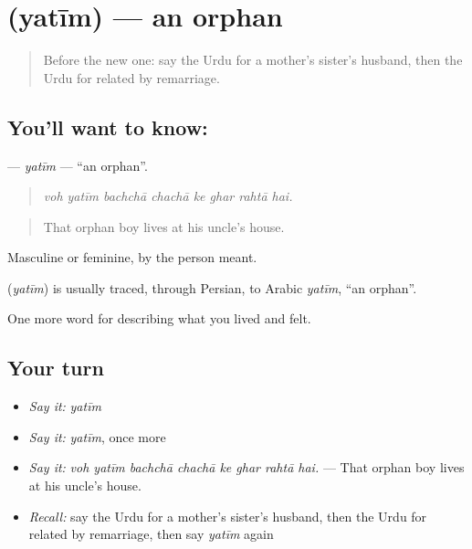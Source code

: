 \section[\texorpdfstring{\ur{یتیم} (yatīm)}{یتیم (yatīm)}]{ (yatīm) — an orphan}

\label{lesson:UR-C490-yatim}



\begin{quote}
Before the new one: say the Urdu for a mother's sister's husband, then the Urdu for related by remarriage.
\end{quote}

\subsection*{You'll want to know: }
\textbf{} — \emph{yatīm} — \textquotedblleft{}an orphan\textquotedblright{}.

\begin{quote}
       
\end{quote}

\begin{quote}
\emph{voh yatīm bachchā chachā ke ghar rahtā hai.}
\end{quote}

\begin{quote}
That orphan boy lives at his uncle's house.
\end{quote}

Masculine or feminine, by the person meant.

\begin{cousinweb}
\textbf{} (\emph{yatīm}) is usually traced, through Persian, to Arabic \emph{yatīm}, \textquotedblleft{}an orphan\textquotedblright{}.
\end{cousinweb}

\begin{grammarlens}[title={What you've built}]
One more word for describing what you lived and felt.
\end{grammarlens}

\subsection*{Your turn}
\begin{itemize}
\raggedright
  \item \emph{Say it:} \emph{yatīm}
  \item \emph{Say it:} \emph{yatīm}, once more
  \item \emph{Say it:} \emph{voh yatīm bachchā chachā ke ghar rahtā hai.} — That orphan boy lives at his uncle's house.
  \item \emph{Recall:} say the Urdu for a mother's sister's husband, then the Urdu for related by remarriage, then say \emph{yatīm} again
\end{itemize}

